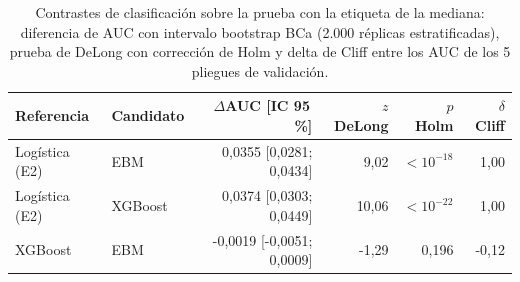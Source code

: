 \begin{table}[htbp]
\caption{Contrastes de clasificación sobre la prueba con la etiqueta de la mediana: diferencia de AUC con intervalo bootstrap BCa (2.000 réplicas estratificadas), prueba de DeLong con corrección de Holm y delta de Cliff entre los AUC de los 5 pliegues de validación.}\label{tab:contrastes_clf}
\footnotesize\setlength{\tabcolsep}{2.8pt}
\begin{tabular}{llrrrr}
\toprule
\textbf{Referencia} & \textbf{Candidato} & \textbf{$\Delta$AUC [IC 95\,\%]} & \textbf{$z$ DeLong} & \textbf{$p$ Holm} & \textbf{$\delta$ Cliff} \\
\midrule
Logística (E2) & EBM & 0,0355 [0,0281; 0,0434] & 9,02 & $<10^{-18}$ & 1,00 \\
Logística (E2) & XGBoost & 0,0374 [0,0303; 0,0449] & 10,06 & $<10^{-22}$ & 1,00 \\
XGBoost & EBM & -0,0019 [-0,0051; 0,0009] & -1,29 & 0,196 & -0,12 \\
\bottomrule
\end{tabular}
\end{table}
